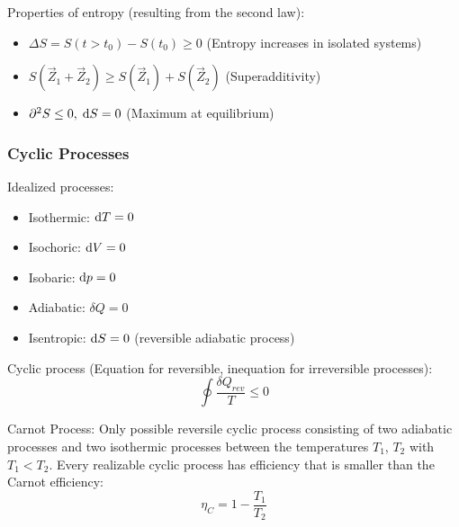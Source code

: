 			\noindent
			Properties of entropy (resulting from the second law):
			\begin{itemize}\itemsep -0pt	%
				\item $\Delta S = S(t>t_0)-S(t_0) \ge 0$ \hfill{(Entropy increases in isolated systems)}
				\item $S(\vec{Z}_1 + \vec{Z}_2) \ge S(\vec{Z}_1) + S(\vec{Z}_2)$ \hfill{(Superadditivity)}
				\item $\partial^2 S \le 0,\;\mathrm{d} S = 0$ \hfill{(Maximum at equilibrium)}
			\end{itemize}

		\subsubsection{Cyclic Processes}
			\noindent
			Idealized processes:
			\begin{itemize}
				\item Isothermic: $\mathrm{d} T = 0$
				\item Isochoric: $\mathrm{d} V = 0$
				\item Isobaric: $\mathrm{d} p = 0$
				\item Adiabatic: $\delta Q = 0$
				\item Isentropic: $\mathrm{d} S = 0$ (reversible adiabatic process)
			\end{itemize}

			\noindent
			Cyclic process (Equation for reversible, inequation for irreversible processes):
			\begin{equation}
				\oint \frac{\delta Q_{rev}}{T} \le 0
			\end{equation}

			\noindent
			Carnot Process:
			Only possible reversile cyclic process consisting of two adiabatic processes and two isothermic processes between the temperatures $T_1$, $T_2$ with $T_1 < T_2$. Every realizable cyclic process has efficiency that is smaller than the Carnot efficiency:
			\begin{equation}
				\eta_C = 1-\frac{T_1}{T_2}
			\end{equation}


